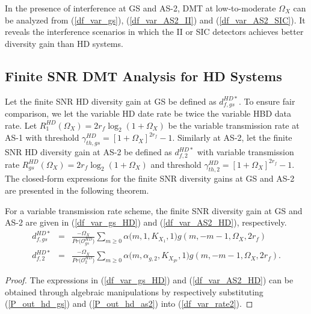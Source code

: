 In the presence of interference at GS and AS-2, DMT at low-to-moderate $\Omega_X$ can be analyzed from (\ref{df_var_gs}), (\ref{df_var_AS2_II}) and (\ref{df_var_AS2_SIC}). It reveals the interference scenarios in which the II or SIC detectors achieves better diversity gain than HD systems.

\subsection{Finite SNR DMT Analysis for HD Systems}
Let the finite SNR HD diversity gain at GS be defined as $d_{f,gs}^{HD*}$. To ensure fair comparison, we let the variable HD date rate be twice the variable HBD data rate. Let $R_1^{HD}(\Omega_X)=2r_f\log_2(1+\Omega_X)$ be the variable transmission rate at AS-1 with threshold $\gamma_{th,gs}^{HD} = [1+\Omega_X]^{2r_f}-1$. Similarly at AS-2, let the finite SNR HD diversity gain at AS-2 be defined as $d_{f,2}^{HD*}$ with variable transmission rate $R_{gs}^{HD}(\Omega_X)=2r_f\log_2(1+\Omega_X)$ and threshold $\gamma_{th,2}^{HD} = [1+\Omega_X]^{2r_f}-1$. The closed-form expressions for the finite SNR diversity gains at GS and AS-2 are presented in the following theorem.

\begin{theorem}
For a variable transmission rate scheme, the finite SNR diversity gain at GS and AS-2 are given in (\ref{df_var_gs_HD}) and (\ref{df_var_AS2_HD}), respectively.
\begin{eqnarray} 
d_{f,gs}^{HD*} & = & \frac{-\Omega_X}{Pr\big(\mathcal{O}_{gs}^{HD}\big)} \sum_{m\geq0} \alpha\big(m,1,K_{X_1},1\big) g(m,-m-1,\Omega_X,2r_f) \label{df_var_gs_HD} \\
d_{f,2}^{HD*} & = & \frac{-\Omega_X}{Pr\big(\mathcal{O}_{2}^{HD}\big)} \sum_{m\geq0} \alpha\big(m,\alpha_{g,2},K_{X_{gs}},1\big) g(m,-m-1,\Omega_X,2r_f). \label{df_var_AS2_HD}
\end{eqnarray}
\end{theorem}
\begin{proof}
The expressions in (\ref{df_var_gs_HD}) and (\ref{df_var_AS2_HD}) can be obtained through algebraic manipulations by respectively substituting (\ref{P_out_hd_gs}) and (\ref{P_out_hd_as2}) into (\ref{df_var_rate2}).
\end{proof}

